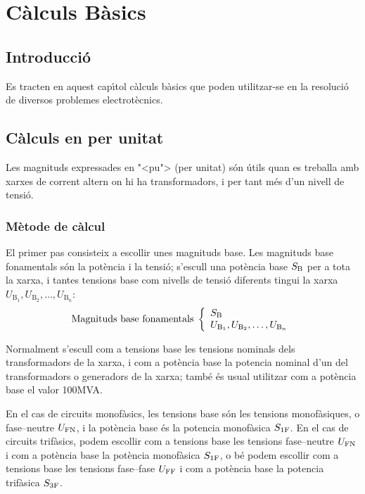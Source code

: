 \chapter{C\`{a}lculs B\`{a}sics}\label{sec:calc_bas}

\section{Introducci\'{o}}
Es tracten en aquest cap\'{\i}tol c\`{a}lculs b\`{a}sics que poden utilitzar-se en la
resoluci\'{o} de diversos problemes electrot\`{e}cnics.



\section{C\`{a}lculs en per unitat} \label{sec:seccio_pu} 

Les magnituds expressades en {"<}pu{">} (per unitat) s\'{o}n \'{u}tils quan es treballa
amb xarxes de corrent altern on hi ha transformadors, i per tant m\'{e}s d'un nivell de tensi\'{o}.

\subsection{M\`{e}tode de c\`{a}lcul} 

 El primer pas consisteix a
escollir unes magnituds base. Les magnituds base fonamentals s\'{o}n la
pot\`{e}ncia i la tensi\'{o}; s'escull una pot\`{e}ncia base $S_\mathrm{B}$ per a
tota la xarxa, i tantes tensions base com nivells de tensi\'{o}
diferents tingui la xarxa $U_{\text{B}_1}, U_{\text{B}_2}, \ldots,
U_{\text{B}_n}$:
\begin{equation}
   \text{Magnituds base fonamentals}\;\left\{
\begin{array}{l}
   S_\mathrm{B} \\
   U_{\text{B}_1}, U_{\text{B}_2}, \ldots, U_{\text{B}_n}
\end{array}
\right.
\end{equation}

Normalment s'escull com a tensions base les tensions nominals dels transformadors de la
xarxa, i com a pot\`{e}ncia base la potencia nominal d'un del transformadors o generadors de la xarxa; tamb\'{e} \'{e}s usual utilitzar com a pot\`{e}ncia base el valor 100\unit{MVA}.

En el cas de circuits monof\`{a}sics, les tensions base s\'{o}n les tensions monof\`{a}siques, o fase--neutre $U_\mathrm{FN}$, i la pot\`{e}ncia base \'{e}s la potencia monof\`{a}sica $S_\mathrm{1F}$. En el cas de circuits trif\`{a}sics, podem escollir com a tensions base les tensions fase--neutre $U_\mathrm{FN}$ i com a pot\`{e}ncia base la pot\`{e}ncia  monof\`{a}sica $S_\mathrm{1F}$, o b\'{e} podem escollir com a tensions base les tensions fase--fase $U_\mathrm{FF}$ i com a pot\`{e}ncia base la potencia trif\`{a}sica $S_\mathrm{3F}$.

